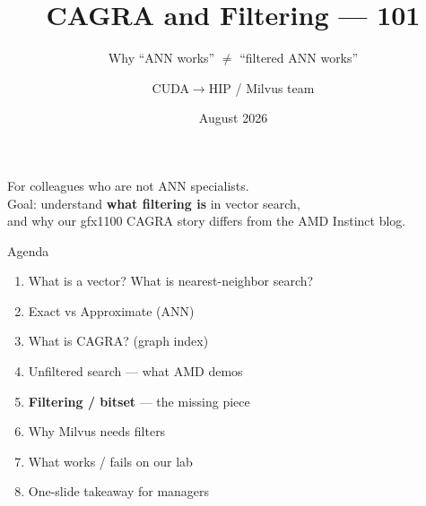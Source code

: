 \documentclass[aspectratio=169,11pt]{beamer}
\title{CAGRA and Filtering --- 101}
\subtitle{Why ``ANN works'' $\neq$ ``filtered ANN works''}
\author{CUDA$\to$HIP / Milvus team}
\date{August 2026}
\begin{document}
\begin{frame}
  \titlepage
  \vspace{0.4em}
  \begin{center}
    \small
    For colleagues who are not ANN specialists.\\
    Goal: understand \textbf{what filtering is} in vector search,\\
    and why our gfx1100 CAGRA story differs from the AMD Instinct blog.
  \end{center}
\end{frame}

\begin{frame}{Agenda}
  \begin{enumerate}
    \item What is a vector? What is nearest-neighbor search?
    \item Exact vs Approximate (ANN)
    \item What is CAGRA? (graph index)
    \item Unfiltered search --- what AMD demos
    \item \textbf{Filtering / bitset} --- the missing piece
    \item Why Milvus needs filters
    \item What works / fails on our lab
    \item One-slide takeaway for managers
  \end{enumerate}
\end{frame}

\end{document}
